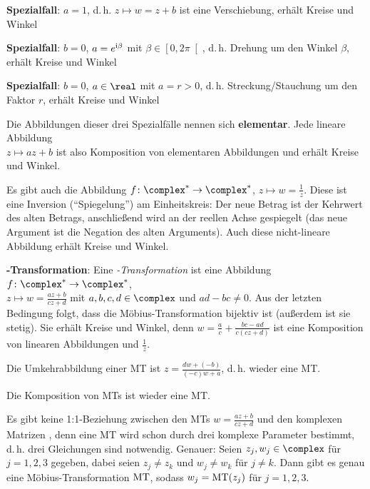 \textbf{Spezialfall}:
$a = 1$, d.\,h. $z \mapsto w = z + b$
ist eine Verschiebung, erhält Kreise und Winkel

\textbf{Spezialfall}:
$b = 0$, $a = e^{\mathrm{i} \beta}$ mit $\beta \in \left[0, 2\pi\right[$,
d.\,h. Drehung um den Winkel $\beta$, erhält Kreise und Winkel

\textbf{Spezialfall}:
$b = 0$, $a \in \real$ mit $a = r > 0$,
d.\,h. Streckung/Stauchung um den Faktor $r$, erhält Kreise und Winkel

Die Abbildungen dieser drei Spezialfälle nennen sich \textbf{elementar}.
Jede lineare Abbildung\\
$z \mapsto az + b$ ist also Komposition von elementaren Abbildungen
und erhält Kreise und Winkel.

Es gibt auch die Abbildung $f\colon \complex^\ast \rightarrow \complex^\ast$,
$z \mapsto w = \frac{1}{z}$.
Diese ist eine Inversion ("`Spiegelung"') am Einheitskreis:
Der neue Betrag ist
der Kehrwert des alten Betrags, anschließend wird an der reellen
Achse gespiegelt (das neue Argument ist die Negation des alten Arguments).
Auch diese nicht-lineare Abbildung erhält Kreise und Winkel.

\linie

\textbf{-Transformation}:
Eine \emph{-Transformation} ist eine Abbildung
$f\colon \complex^\ast \rightarrow \complex^\ast$,\\
$z \mapsto w = \frac{az + b}{cz + d}$ mit $a, b, c, d \in \complex$ und
$ad - bc \not= 0$.
Aus der letzten Bedingung folgt, dass die Möbius-Transformation bijektiv
ist (außerdem ist sie stetig).
Sie erhält Kreise und Winkel, denn
$w = \frac{a}{c} + \frac{bc - ad}{c (cz + d)}$ ist eine Komposition von
linearen Abbildungen und $\frac{1}{z}$.

Die Umkehrabbildung einer MT ist
$z = \frac{dw + (-b)}{(-c)w + a}$, d.\,h. wieder eine MT.

Die Komposition von MTs ist wieder eine MT.

\linie

Es gibt keine 1:1-Beziehung zwischen den MTs $w = \frac{az + b}{cz + d}$ und
den komplexen Matrizen
,
denn eine MT wird schon durch drei komplexe Parameter
bestimmt, d.\,h. drei Gleichungen sind notwendig.
Genauer:
Seien $z_j, w_j \in \complex$ für $j = 1, 2, 3$ gegeben, dabei seien
$z_j \not= z_k$ und $w_j \not= w_k$ für $j \not= k$.
Dann gibt es genau eine Möbius-Transformation $\operatorname{MT}$, sodass
$w_j = \operatorname{MT}(z_j)$ für $j = 1, 2, 3$.

